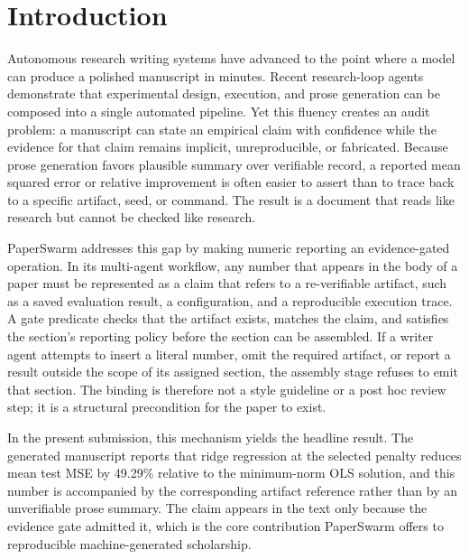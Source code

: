 \section{Introduction}

Autonomous research writing systems have advanced to the point where a model can produce a polished manuscript in minutes. Recent research-loop agents \citep{xia2026researchloop,ren2026evigraph,luo2026xscientist} demonstrate that experimental design, execution, and prose generation can be composed into a single automated pipeline. Yet this fluency creates an audit problem: a manuscript can state an empirical claim with confidence while the evidence for that claim remains implicit, unreproducible, or fabricated. Because prose generation favors plausible summary over verifiable record, a reported mean squared error or relative improvement is often easier to assert than to trace back to a specific artifact, seed, or command. The result is a document that reads like research but cannot be checked like research.

PaperSwarm addresses this gap by making numeric reporting an evidence-gated operation. In its multi-agent workflow, any number that appears in the body of a paper must be represented as a claim that refers to a re-verifiable artifact, such as a saved evaluation result, a configuration, and a reproducible execution trace. A gate predicate checks that the artifact exists, matches the claim, and satisfies the section's reporting policy before the section can be assembled. If a writer agent attempts to insert a literal number, omit the required artifact, or report a result outside the scope of its assigned section, the assembly stage refuses to emit that section. The binding is therefore not a style guideline or a post hoc review step; it is a structural precondition for the paper to exist.

In the present submission, this mechanism yields the headline result. The generated manuscript reports that ridge regression at the selected penalty reduces mean test MSE by 49.29\% relative to the minimum-norm OLS solution, and this number is accompanied by the corresponding artifact reference rather than by an unverifiable prose summary. The claim appears in the text only because the evidence gate admitted it, which is the core contribution PaperSwarm offers to reproducible machine-generated scholarship.
